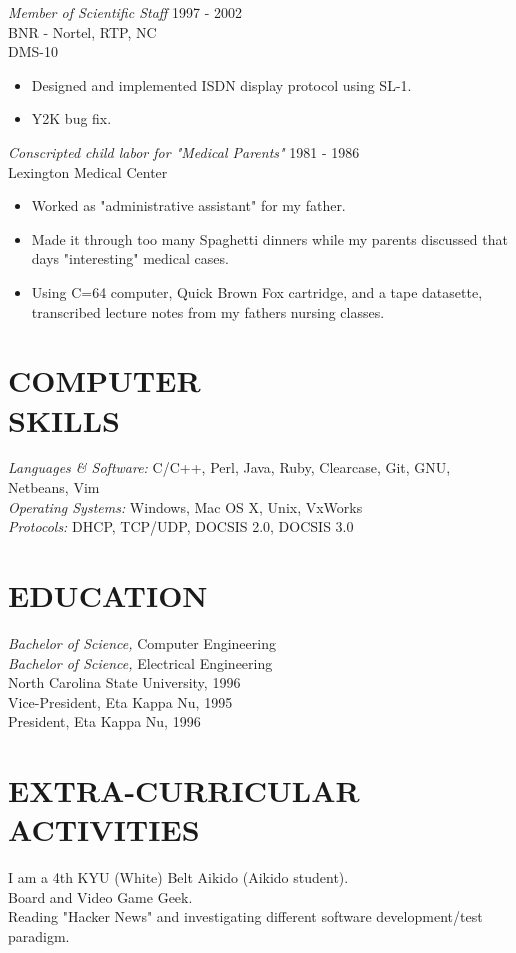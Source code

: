 \documentclass[line,margin]{res}
\begin{document}
\begin{resume}
                {\sl Member of Scientific Staff} \hfill 1997 - 2002 \\
                BNR - Nortel, RTP, NC \\
                DMS-10
                 \begin{itemize}  \itemsep -2pt %
                 \item Designed and implemented ISDN display protocol using SL-1.
                 \item Y2K bug fix.
                 \end{itemize}

                {\sl Conscripted child labor for "Medical Parents"} \hfill 1981 - 1986 \\
                Lexington Medical Center 
                 \begin{itemize}  \itemsep -2pt %
                 \item Worked as "administrative assistant" for my father.
                 \item Made it through too many Spaghetti dinners while my parents discussed that days "interesting" medical cases.
                 \item Using C=64 computer, Quick Brown Fox cartridge, and a tape datasette, transcribed lecture notes from my fathers nursing classes.
                 \end{itemize}
 
\section{COMPUTER \\ SKILLS} {\sl Languages \& Software:} C/C++, Perl, Java,
                Ruby, Clearcase, Git, GNU, Netbeans, Vim \\
                {\sl Operating Systems:} Windows, Mac OS X, Unix, VxWorks \\ 
                {\sl Protocols:} DHCP, TCP/UDP, DOCSIS 2.0, DOCSIS 3.0
 
\section{EDUCATION} {\sl Bachelor of Science,} Computer Engineering \\
                    {\sl Bachelor of Science,} Electrical Engineering \\
                North Carolina State University, 1996 \\
                Vice-President, Eta Kappa Nu, 1995 \\ 
                President, Eta Kappa Nu, 1996 \\
 
\section{EXTRA-CURRICULAR \\ ACTIVITIES}             
             I am a 4th KYU (White) Belt Aikido (Aikido student). \\
             Board and Video Game Geek. \\
             Reading "Hacker News" and investigating different software development/test paradigm.

\end{resume}
\end{document}
